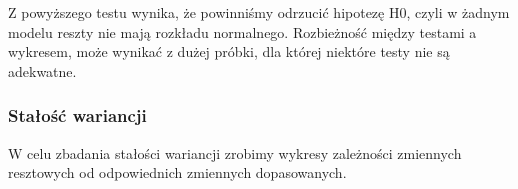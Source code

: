 \documentclass[
]{article}
\newenvironment{Shaded}{\begin{snugshade}}{\end{snugshade}}
\newcommand{\AttributeTok}[1]{\textcolor[rgb]{0.13,0.29,0.53}{#1}}
\newcommand{\ControlFlowTok}[1]{\textcolor[rgb]{0.13,0.29,0.53}{\textbf{#1}}}
\newcommand{\DecValTok}[1]{\textcolor[rgb]{0.00,0.00,0.81}{#1}}
\newcommand{\FloatTok}[1]{\textcolor[rgb]{0.00,0.00,0.81}{#1}}
\newcommand{\FunctionTok}[1]{\textcolor[rgb]{0.13,0.29,0.53}{\textbf{#1}}}
\newcommand{\NormalTok}[1]{#1}
\newcommand{\OtherTok}[1]{\textcolor[rgb]{0.56,0.35,0.01}{#1}}
\newcommand{\SpecialCharTok}[1]{\textcolor[rgb]{0.81,0.36,0.00}{\textbf{#1}}}
\newcommand{\StringTok}[1]{\textcolor[rgb]{0.31,0.60,0.02}{#1}}
\begin{document}
Z powyższego testu wynika, że powinniśmy odrzucić hipotezę H0, czyli w
żadnym modelu reszty nie mają rozkładu normalnego. Rozbieżność między
testami a wykresem, może wynikać z dużej próbki, dla której niektóre
testy nie są adekwatne.

\subsubsection{Stałość wariancji}\label{staux142oux15bux107-wariancji}

W celu zbadania stałości wariancji zrobimy wykresy zależności zmiennych
resztowych od odpowiednich zmiennych dopasowanych.

\begin{Shaded}
\end{Shaded}
\end{document}
